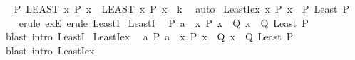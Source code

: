 \begin{isabellebody}
\ \isamarkupfalse%
\ {\isachardoublequoteopen}P\ {\isacharparenleft}{\kern0pt}LEAST\ x{\isachardot}{\kern0pt}\ P\ x{\isacharparenright}{\kern0pt}{\isachardoublequoteclose}\ \ {\isachardoublequoteopen}{\isacharparenleft}{\kern0pt}LEAST\ x{\isachardot}{\kern0pt}\ P\ x{\isacharparenright}{\kern0pt}\ {\isasymle}\ k{\isachardoublequoteclose}\ \isamarkupfalse%
\ auto\isanewline
{}\isamarkupfalse%
\isanewline
\isanewline
%
%
\endisatagproof
{\isafoldproof}%
%
\isadelimproof
\isanewline
%
\endisadelimproof
{}\isamarkupfalse%
\ LeastI{\isacharunderscore}{\kern0pt}ex{\isacharcolon}{\kern0pt}\ {\isachardoublequoteopen}{\isasymexists}x{\isachardot}{\kern0pt}\ P\ x\ {\isasymLongrightarrow}\ P\ {\isacharparenleft}{\kern0pt}Least\ P{\isacharparenright}{\kern0pt}{\isachardoublequoteclose}\isanewline
%
\isadelimproof
\ \ %
\endisadelimproof
%
\isatagproof
{}\isamarkupfalse%
\ {\isacharparenleft}{\kern0pt}erule\ exE{\isacharparenright}{\kern0pt}\ {\isacharparenleft}{\kern0pt}erule\ LeastI{\isacharparenright}{\kern0pt}%
\endisatagproof
{\isafoldproof}%
%
\isadelimproof
\isanewline
%
\endisadelimproof
\isanewline
{}\isamarkupfalse%
\ LeastI{}{\isacharcolon}{\kern0pt}\isanewline
\ \ {\isachardoublequoteopen}P\ a\ {\isasymLongrightarrow}\ {\isacharparenleft}{\kern0pt}{\isasymAnd}x{\isachardot}{\kern0pt}\ P\ x\ {\isasymLongrightarrow}\ Q\ x{\isacharparenright}{\kern0pt}\ {\isasymLongrightarrow}\ Q\ {\isacharparenleft}{\kern0pt}Least\ P{\isacharparenright}{\kern0pt}{\isachardoublequoteclose}\isanewline
%
\isadelimproof
\ \ %
\endisadelimproof
%
\isatagproof
{}\isamarkupfalse%
\ {\isacharparenleft}{\kern0pt}blast\ intro{\isacharcolon}{\kern0pt}\ LeastI{\isacharparenright}{\kern0pt}%
\endisatagproof
{\isafoldproof}%
%
\isadelimproof
\isanewline
%
\endisadelimproof
\isanewline
{}\isamarkupfalse%
\ LeastI{}{\isacharunderscore}{\kern0pt}ex{\isacharcolon}{\kern0pt}\isanewline
\ \ {\isachardoublequoteopen}{\isasymexists}a{\isachardot}{\kern0pt}\ P\ a\ {\isasymLongrightarrow}\ {\isacharparenleft}{\kern0pt}{\isasymAnd}x{\isachardot}{\kern0pt}\ P\ x\ {\isasymLongrightarrow}\ Q\ x{\isacharparenright}{\kern0pt}\ {\isasymLongrightarrow}\ Q\ {\isacharparenleft}{\kern0pt}Least\ P{\isacharparenright}{\kern0pt}{\isachardoublequoteclose}\isanewline
%
\isadelimproof
\ \ %
\endisadelimproof
%
\isatagproof
{}\isamarkupfalse%
\ {\isacharparenleft}{\kern0pt}blast\ intro{\isacharcolon}{\kern0pt}\ LeastI{\isacharunderscore}{\kern0pt}ex{\isacharparenright}{\kern0pt}%

\end{isabellebody}
